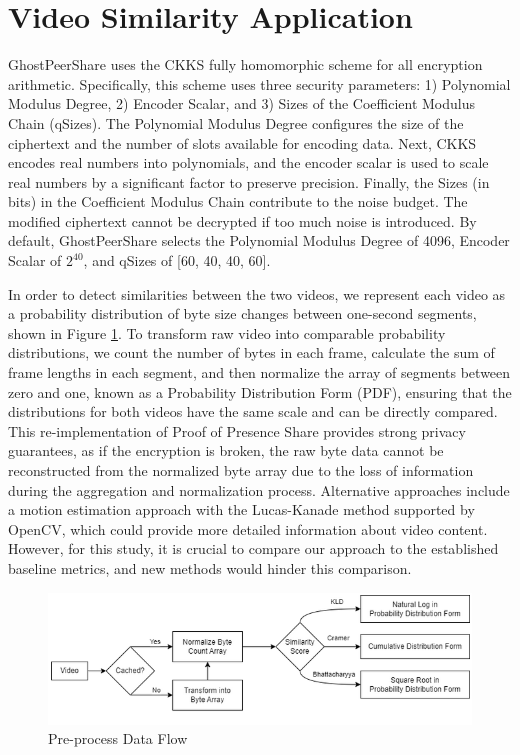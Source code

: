 \section{Video Similarity Application}
\label{sec:Video Similarity Application}
GhostPeerShare uses the CKKS \cite{Cheon2017-CKKS} fully homomorphic scheme for all encryption arithmetic. Specifically, this scheme uses three security parameters: 1) Polynomial Modulus Degree, 2) Encoder Scalar, and 3) Sizes of the Coefficient Modulus Chain (qSizes). The Polynomial Modulus Degree configures the size of the ciphertext and the number of slots available for encoding data. Next, CKKS encodes real numbers into polynomials, and the encoder scalar is used to scale real numbers by a significant factor to preserve precision. Finally, the Sizes (in bits) in the Coefficient Modulus Chain contribute to the noise budget. The modified ciphertext cannot be decrypted if too much noise is introduced. By default, GhostPeerShare selects the Polynomial Modulus Degree of 4096, Encoder Scalar of $2^{40}$, and qSizes of [60, 40, 40, 60].

In order to detect similarities between the two videos, we represent each video as a probability distribution of byte size changes between one-second segments, shown in Figure \ref{fig:preprocess-data-flow}. To transform raw video into comparable probability distributions, we count the number of bytes in each frame, calculate the sum of frame lengths in each segment, and then normalize the array of segments between zero and one, known as a Probability Distribution Form (PDF), ensuring that the distributions for both videos have the same scale and can be directly compared. This re-implementation of Proof of Presence Share \cite{Lagesse2021-PopShare} provides strong privacy guarantees, as if the encryption is broken, the raw byte data cannot be reconstructed from the normalized byte array due to the loss of information during the aggregation and normalization process. Alternative approaches include a motion estimation approach with the Lucas-Kanade method \cite{Lucas1981-uy} supported by OpenCV, which could provide more detailed information about video content. However, for this study, it is crucial to compare our approach to the established baseline metrics, and new methods would hinder this comparison.

\begin{figure}[t]
    \centering
    \includegraphics[width=\textwidth]{4 Design/4.3 Preprocess Data Flow.png}
    \caption{Pre-process Data Flow}
    \label{fig:preprocess-data-flow}
\end{figure}

